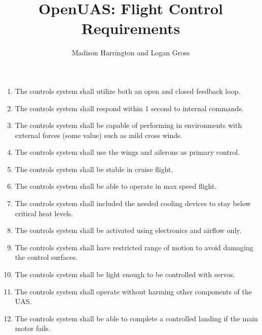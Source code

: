 \documentclass{article}
\begin{document}
\title{OpenUAS: Flight Control Requirements}

\author{Madison Harrington and Logan Gross}

\maketitle

\begin{enumerate}

\item The controls system shall utilize both an open and closed feedback loop.\\

\item The controls system shall respond within 1 second to internal commands.\\

\item The controls system shall be capable of performing in environments with external forces (some value) such as mild cross winds.\\

\item The controls system shall use the wings and ailerons as primary control.\\

\item The controls system shall be stable in cruise flight.\\

\item The controls system shall be able to operate in max speed flight.\\

\item The controls system shall included the needed cooling devices to stay below critical heat levels.\\

\item The controls system shall be activated using electronics and airflow only.\\

\item The controls system shall have restricted range of motion to avoid damaging the control surfaces.\\

\item The controls system shall be light enough to be controlled with servos. \\

\item The controls system shall operate without harming other components of the UAS.\\

\item The controls system shall be able to complete a controlled landing if the main motor fails.\\

\end{enumerate}
\end{document}
